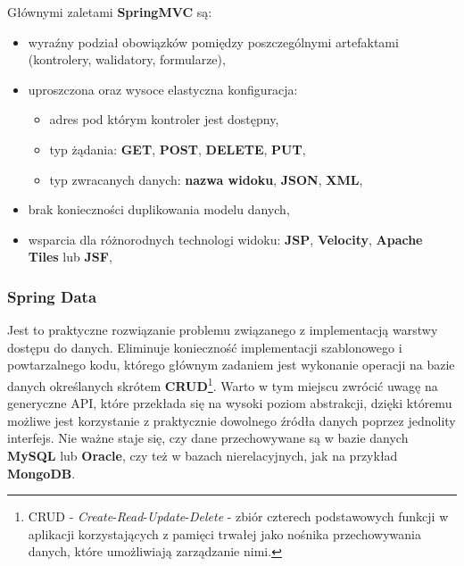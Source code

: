 		Głównymi zaletami \textbf{SpringMVC} są:
		\begin{itemize}
			\item wyraźny podział obowiązków pomiędzy poszczególnymi artefaktami (kontrolery, walidatory, formularze),
			\item uproszczona oraz wysoce elastyczna konfiguracja:
			\begin{itemize}
				\item adres pod którym kontroler jest dostępny,
				\item typ żądania: \textbf{GET}, \textbf{POST}, \textbf{DELETE}, \textbf{PUT},
				\item typ zwracanych danych: \textbf{nazwa widoku}, \textbf{JSON}, \textbf{XML},
			\end{itemize}
			\item brak konieczności duplikowania modelu danych,
			\item wsparcia dla różnorodnych technologi widoku: \textbf{JSP}, \textbf{Velocity}, \textbf{Apache Tiles} lub \textbf{JSF},
		\end{itemize}
		
		\subsubsection{Spring Data}
		\label{app:spring_data}
		Jest to praktyczne rozwiązanie problemu związanego z implementacją warstwy dostępu do danych. Eliminuje konieczność implementacji szablonowego i powtarzalnego kodu, którego głównym zadaniem jest wykonanie operacji na bazie danych określanych skrótem \textbf{CRUD}\footnote{CRUD - \textit{Create}-\textit{Read}-\textit{Update}-\textit{Delete} - zbiór czterech podstawowych funkcji w aplikacji korzystających z pamięci trwałej jako nośnika przechowywania danych, które umożliwiają zarządzanie nimi.}. Warto w tym miejscu zwrócić uwagę na generyczne API, które przekłada się na wysoki poziom abstrakcji, dzięki któremu możliwe jest korzystanie z praktycznie dowolnego źródła danych poprzez jednolity interfejs. Nie ważne staje się, czy dane przechowywane są w bazie danych \textbf{MySQL} lub \textbf{Oracle}, czy też w bazach nierelacyjnych, jak na przykład \textbf{MongoDB}. 
		
